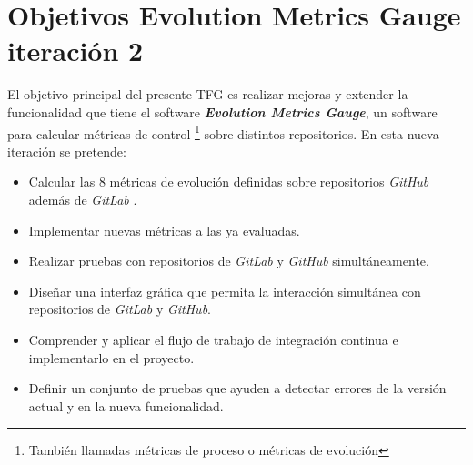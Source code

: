 \section{Objetivos Evolution Metrics Gauge iteración 2}
   
El objetivo principal del presente TFG es realizar mejoras y extender la funcionalidad que tiene el software \textit{\textbf{Evolution Metrics Gauge}}, un software para calcular métricas de control \footnote{También llamadas métricas de proceso o métricas de evolución} sobre distintos repositorios.
En esta nueva iteración se pretende:

\begin{itemize}
	\tightlist
	\item Calcular las 8 métricas de evolución definidas sobre repositorios \textit{GitHub} además de \textit{GitLab} .
	\item Implementar nuevas métricas a las ya evaluadas.
	\item Realizar pruebas con repositorios de \textit{GitLab} y \textit{GitHub} simultáneamente.
	\item Diseñar una interfaz gráfica que permita la interacción simultánea con repositorios de \textit{GitLab} y \textit{GitHub}.
	\item Comprender y aplicar el flujo de trabajo de integración continua e implementarlo en el proyecto.
	\item Definir un conjunto de pruebas que ayuden a detectar errores de la versión actual y en la nueva funcionalidad.
\end{itemize}

\newpage


